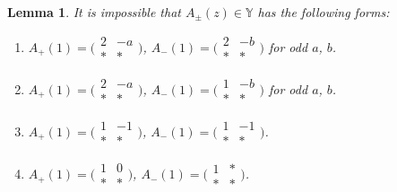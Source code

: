 \documentclass[pdftex]{sigma}
\numberwithin{equation}{section}
\newtheorem{Lemma}[Theorem]{Lemma}
\theoremstyle{definition}
\begin{document}
\begin{Lemma}\label{lemma:ban list}
 It is impossible that $A_\pm(z) \in \mathbb{Y}$ has the following forms:
 \begin{enumerate}\itemsep=0pt
 \item[$(1)$]
 $A_+(1) =
 \bigl(\begin{smallmatrix}
 2 & -a \\
 * & *
 \end{smallmatrix}\bigr)$,
 $A_-(1) =
 \bigl(\begin{smallmatrix}
 2 & -b \\
 * & *
 \end{smallmatrix}\bigr)$ for odd $a$, $b$.
 \item[$(2)$]
 $A_+(1) =
 \bigl(\begin{smallmatrix}
 2 & -a \\
 * & *
 \end{smallmatrix}\bigr)$,
 $A_-(1) =
 \bigl(\begin{smallmatrix}
 1 & -b \\
 * & *
 \end{smallmatrix}\bigr)$ for odd $a$, $b$.
 \item[$(3)$]
 $A_+(1) =
 \bigl(\begin{smallmatrix}
 1 & -1 \\
 * & *
 \end{smallmatrix}\bigr)$,
 $A_-(1) =
 \bigl(\begin{smallmatrix}
 1 & -1 \\
 * & *
 \end{smallmatrix}\bigr)$.
 \item[$(4)$]
 $A_+(1) =
 \bigl(\begin{smallmatrix}
 1 & 0 \\
 * & *
 \end{smallmatrix}\bigr)$,
 $A_-(1) =
 \bigl(\begin{smallmatrix}
 1 & * \\
 * & *
 \end{smallmatrix}\bigr)$.
 \end{enumerate}
\end{Lemma}
\end{document}
